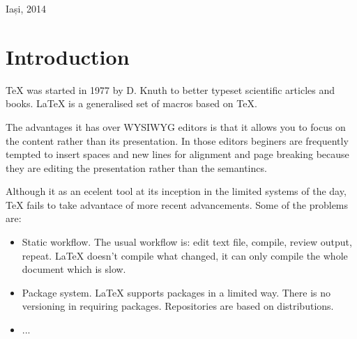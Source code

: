 \documentclass{llncs}
\begin{document}
\vspace{1.5cm}

\begin{center}
    \color{white}\textsf{Iași, 2014}
\end{center}

\pagebreak

\begin{abstract}

This report describes the building of a system for collaborative editing of \LaTeX{} projects. This includes simultaneous editing of multiple files, manipulating the history, ... Sharing features... This paper only describes the technical details and not all the features (which are reviewed in a demo on the website: \texttt{multilatex.com}).

\end{abstract}

\section{Introduction}

\TeX{} was started in 1977 by D. Knuth to better typeset scientific articles and books. \LaTeX{} is a generalised set of macros based on \TeX{}.

The advantages it has over WYSIWYG editors is that it allows you to focus on the content rather than its presentation. In those editors beginers are frequently tempted to insert spaces and new lines for alignment and page breaking because they are editing the presentation rather than the semantincs.

Although it as an ecelent tool at its inception in the limited systems of the day, \TeX{} fails to take advantace of more recent advancements. Some of the problems are:

\begin{itemize}

\item Static workflow. The usual workflow is: edit text file, compile, review output, repeat. \LaTeX{} doesn't compile what changed, it can only compile the whole document which is slow.

\item Package system. \LaTeX{} supports packages in a limited way. There is no versioning in requiring packages. Repositories are based on distributions.

\item ...

\end{itemize}
\end{document}
